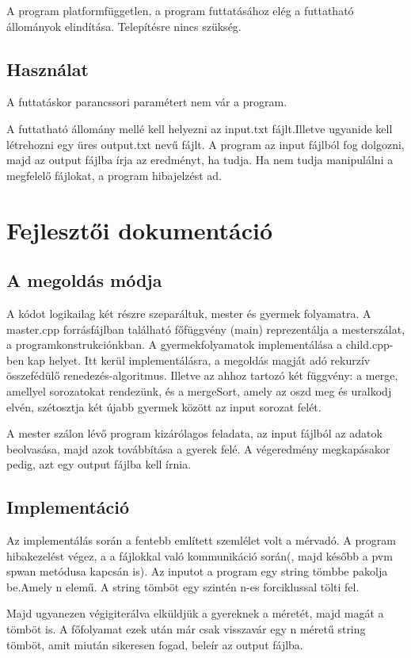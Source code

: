 \documentclass[a4paper,12pt]{amsart}%
\begin{document}
A program platformfüggetlen, a program futtatásához elég a futtatható állományok elindítása. 
Telepítésre nincs szükség. 

\subsection{Használat}

A futtatáskor parancssori paramétert nem vár a program.

A futtatható állomány mellé kell helyezni az input.txt fájlt.Illetve ugyanide kell létrehozni egy üres output.txt nevű fájlt.
A program az input fájlból fog dolgozni, majd az output fájlba írja az eredményt, ha tudja.
Ha nem tudja manipulálni a megfelelő fájlokat, a program hibajelzést ad.

\section{Fejlesztői dokumentáció}
\subsection{A megoldás módja}
A kódot logikailag két részre szeparáltuk, mester és gyermek folyamatra. A master.cpp forrásfájlban található főfüggvény (main) reprezentálja a mesterszálat, a programkonstrukciónkban. A gyermekfolyamatok implementálása a child.cpp-ben kap helyet.
Itt kerül implementálásra, a megoldás magját adó rekurzív összefédülő renedezés-algoritmus. Illetve az ahhoz tartozó két függvény: a merge, amellyel sorozatokat rendezünk, és a mergeSort, amely az oszd meg és uralkodj elvén, szétosztja két újabb gyermek között az input sorozat felét.

A mester szálon lévő program kizárólagos feladata, az input fájlból az adatok beolvasása, majd azok továbbítása a gyerek felé.
A végeredmény megkapásakor pedig, azt egy output fájlba kell írnia.

\subsection{Implementáció}
Az implementálás során a fentebb említett szemlélet volt a mérvadó.
A program hibakezelést végez, a a fájlokkal való kommunikáció során(, majd később a pvm spwan metódusa kapcsán is).
Az inputot a program egy string tömbbe pakolja be.Amely n elemű.
A string tömböt egy szintén n-es forciklussal tölti fel.

Majd ugyanezen végigiterálva elküldjük a gyereknek a méretét, majd magát a tömböt is.
A főfolyamat ezek után már csak visszavár egy n méretű string tömböt, amit miután sikeresen fogad, beleír az output fájlba.
\end{document}
